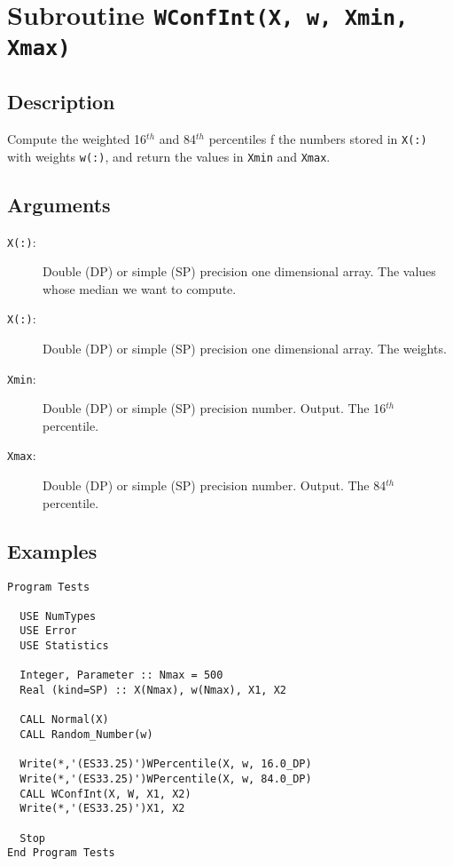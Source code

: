 \section{Subroutine \texttt{WConfInt(X, w, Xmin, Xmax)}}

\subsection{Description}

Compute the weighted 16$^{th}$ and 84$^{th}$ percentiles f the numbers stored in
\texttt{X(:)} 
with weights \texttt{w(:)}, and return the values in \texttt{Xmin} and
\texttt{Xmax}. 

\subsection{Arguments}

\begin{description}
\item[\texttt{X(:)}:] Double (DP) or simple (SP) precision one
  dimensional array. The values  whose median we want to compute.
\item[\texttt{X(:)}:] Double (DP) or simple (SP) precision one
  dimensional array. The weights.
\item[\texttt{Xmin}:] Double (DP) or simple (SP) precision
  number. Output. The
  16$^{th}$ percentile.
\item[\texttt{Xmax}:] Double (DP) or simple (SP) precision
  number. Output. The
  84$^{th}$ percentile.
\end{description}

\subsection{Examples}

\begin{lstlisting}[emph=WConfInt,
                   emphstyle=\color{blue},
                   frame=trBL,
                   caption=Computing the 1 sigma confidence interval in two ways., 
                   label=wconfint]
Program Tests

  USE NumTypes
  USE Error
  USE Statistics

  Integer, Parameter :: Nmax = 500
  Real (kind=SP) :: X(Nmax), w(Nmax), X1, X2

  CALL Normal(X)
  CALL Random_Number(w)

  Write(*,'(ES33.25)')WPercentile(X, w, 16.0_DP)
  Write(*,'(ES33.25)')WPercentile(X, w, 84.0_DP)
  CALL WConfInt(X, W, X1, X2)
  Write(*,'(ES33.25)')X1, X2
  
  Stop
End Program Tests
\end{lstlisting}

